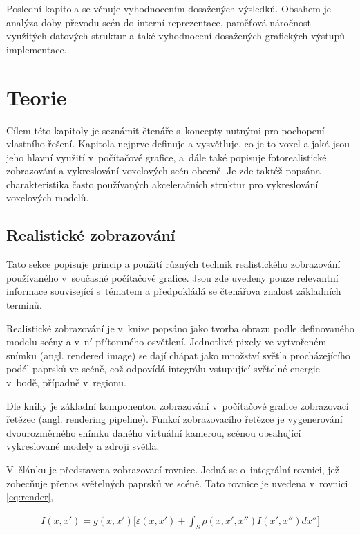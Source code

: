Poslední kapitola se věnuje vyhodnocením dosažených výsledků. Obsahem je analýza doby převodu scén do interní reprezentace, paměťová náročnost využitých datových struktur a také vyhodnocení dosažených grafických výstupů implementace.

\chapter{Teorie}
\label{teorie}
Cílem této kapitoly je seznámit čtenáře s~koncepty nutnými pro pochopení vlastního řešení. Kapitola nejprve definuje a vysvětluje, co je to voxel a jaká jsou jeho hlavní využití v~počítačové grafice, a~dále také popisuje fotorealistické zobrazování a vykreslování voxelových scén obecně. Je zde taktéž popsána charakteristika často používaných akceleračních struktur pro vykreslování voxelových modelů.

\section{Realistické zobrazování}
Tato sekce popisuje princip a použití různých technik realistického zobrazování používaného v~současné počítačové grafice. Jsou zde uvedeny pouze relevantní informace související s~tématem a předpokládá se čtenářova znalost základních termínů.

Realistické zobrazování je v~knize \cite{gfx_principles_practice} popsáno jako tvorba obrazu podle definovaného modelu scény a v~ní přítomného osvětlení. Jednotlivé pixely ve vytvořeném snímku (angl. rendered image) se dají chápat jako množství světla procházejícího podél paprsků ve scéně, což odpovídá integrálu vstupující světelné energie v~bodě, případně v~regionu.

Dle knihy \cite{real_time_render} je základní komponentou zobrazování v~počítačové grafice zobrazovací řetězec (angl. rendering pipeline). Funkcí zobrazovacího řetězce je vygenerování dvourozměrného snímku daného virtuální kamerou, scénou obsahující vykreslované modely a zdroji světla.

V~článku \cite{render_eq} je představena zobrazovací rovnice. Jedná se o~integrální rovnici, jež zobecňuje přenos světelných paprsků ve scéně. Tato rovnice je uvedena v~rovnici \ref{eq:render},

\begin{equation} \label{eq:render}
	\begin{gathered}
		I(x, x') = g(x, x') \Big[\varepsilon(x, x') + \int_S\rho(x, x', x'')I(x', x'')dx''\Big]
	\end{gathered}
\end{equation}

